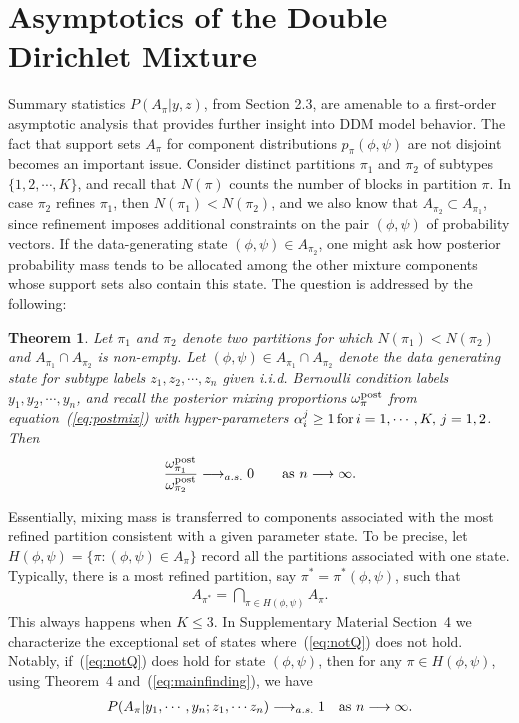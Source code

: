 \documentclass[aoas,preprint]{imsart}
\newtheorem{theorem}{Theorem}
\begin{document}
\section{Asymptotics of the Double Dirichlet Mixture}

Summary statistics $P(A_\pi|y,z)$, from Section 2.3, are amenable to a first-order asymptotic analysis
that provides further insight into DDM model behavior.  The fact that support sets $A_\pi$ for component 
distributions $p_\pi( \phi,\psi)$ are not disjoint becomes an important issue.  Consider
distinct partitions $\pi_1$ and $\pi_2$  of subtypes $\{ 1, 2, \cdots, K\}$, and recall that $N(\pi)$ counts
 the number of blocks in partition $\pi$.   In case $\pi_2$ refines $\pi_1$, then $N(\pi_1) < N(\pi_2)$,
and  we also know that 
 $A_{\pi_2} \subset A_{\pi_1}$, since refinement 
imposes additional constraints on the pair $(\phi, \psi)$ of probability vectors.   
If the data-generating state $(\phi, \psi) \in A_{\pi_2}$, one might ask how posterior probability mass
tends to be allocated among the other mixture components whose
 support sets also contain this state.     The question is addressed 
by the following:

\begin{theorem}  Let $\pi_1$ and $\pi_2$ denote two partitions for which $N(\pi_1) < N(\pi_2)$
 and $A_{\pi_1} \cap A_{\pi_2}$ is non-empty. 
 Let $(\phi,\psi) \in A_{\pi_1} \cap A_{\pi_2}$ denote the data generating state for 
subtype labels $z_1, z_2, \cdots, z_n$ given i.i.d. Bernoulli condition labels $y_1, y_2, \cdots, y_n$, 
and recall the posterior mixing proportions $\omega^{\rm post}_\pi$ from equation~(\ref{eq:postmix}) with 
hyper-parameters $\alpha_i^j \geq 1 \, {\mbox {\rm for}} \,  i = 1, \cdots, K, \, j = 1,2$.   Then
\begin{eqnarray*}
\frac{\omega^{\rm post}_{\pi_1} }{ \omega^{\rm post}_{\pi_2} } \longrightarrow_{a.s.} 0 \qquad 
 {\mbox {\rm as $n \longrightarrow \infty$}}. 
\end{eqnarray*}
\end{theorem}
Essentially, mixing mass is transferred to components associated with the most refined partition
consistent with a given parameter state.  To be precise, let $H(\phi,\psi) = \{ \pi: (\phi,\psi) \in A_{\pi} \}$
record all the partitions associated with one state.   Typically, there is a most refined partition,
say $\pi^* = \pi^*(\phi,\psi)$, such that
\begin{eqnarray}
\label{eq:notQ}
A_{\pi^*} = \bigcap_{\pi \in H(\phi,\psi)} A_\pi.
\end{eqnarray}
This always happens when $K \leq 3$.  In Supplementary Material Section~4 we characterize 
the exceptional set of states where~(\ref{eq:notQ}) does not hold.  Notably, if~(\ref{eq:notQ}) does hold for
state $(\phi,\psi)$, then for any $\pi \in H(\phi,\psi)$, using Theorem~4 and~(\ref{eq:mainfinding}), we have
\begin{eqnarray*}
P(A_\pi|y_1,\cdots,y_n; z_1, \cdots z_n ) \longrightarrow_{a.s.} 1 \quad {\mbox {\rm as $n \longrightarrow \infty$}}.
\end{eqnarray*}
\end{document}
